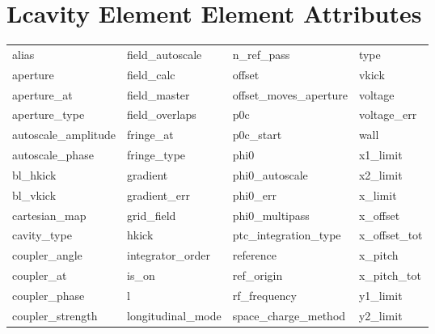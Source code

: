 \vfill
 
 \section{Lcavity Element Element Attributes}
 \label{s:list.lcavity}
 
 \begin{tabular}{llll} \toprule
alias                       & field_autoscale             & n_ref_pass                  & type                        \\
aperture                    & field_calc                  & offset                      & vkick                       \\
aperture_at                 & field_master                & offset_moves_aperture       & voltage                     \\
aperture_type               & field_overlaps              & p0c                         & voltage_err                 \\
autoscale_amplitude         & fringe_at                   & p0c_start                   & wall                        \\
autoscale_phase             & fringe_type                 & phi0                        & x1_limit                    \\
bl_hkick                    & gradient                    & phi0_autoscale              & x2_limit                    \\
bl_vkick                    & gradient_err                & phi0_err                    & x_limit                     \\
cartesian_map               & grid_field                  & phi0_multipass              & x_offset                    \\
cavity_type                 & hkick                       & ptc_integration_type        & x_offset_tot                \\
coupler_angle               & integrator_order            & reference                   & x_pitch                     \\
coupler_at                  & is_on                       & ref_origin                  & x_pitch_tot                 \\
coupler_phase               & l                           & rf_frequency                & y1_limit                    \\
coupler_strength            & longitudinal_mode           & space_charge_method         & y2_limit                    \\

\end{tabular}
